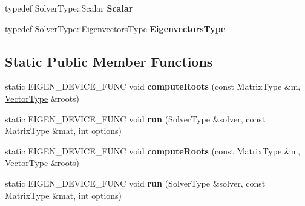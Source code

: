 \begin{DoxyCompactItemize}
typedef Solver\+Type\+::\+Scalar {\bfseries Scalar}
\item 
\mbox{\label{struct_eigen_1_1internal_1_1direct__selfadjoint__eigenvalues_3_01_solver_type_00_012_00_01false_01_4_ab88affec1ba41f7662e263fa86102255}} 
typedef Solver\+Type\+::\+Eigenvectors\+Type {\bfseries Eigenvectors\+Type}
\end{DoxyCompactItemize}
\subsection*{Static Public Member Functions}
\begin{DoxyCompactItemize}
\item 
\mbox{\label{struct_eigen_1_1internal_1_1direct__selfadjoint__eigenvalues_3_01_solver_type_00_012_00_01false_01_4_a49dab7c21eb393c3c3d45890bd34f58e}} 
static E\+I\+G\+E\+N\+\_\+\+D\+E\+V\+I\+C\+E\+\_\+\+F\+U\+NC void {\bfseries compute\+Roots} (const Matrix\+Type \&m, \hyperlink{struct_vector_type}{Vector\+Type} \&roots)
\item 
\mbox{\label{struct_eigen_1_1internal_1_1direct__selfadjoint__eigenvalues_3_01_solver_type_00_012_00_01false_01_4_addc88bfeaab72fc09c5429df3d680bd7}} 
static E\+I\+G\+E\+N\+\_\+\+D\+E\+V\+I\+C\+E\+\_\+\+F\+U\+NC void {\bfseries run} (Solver\+Type \&solver, const Matrix\+Type \&mat, int options)
\item 
\mbox{\label{struct_eigen_1_1internal_1_1direct__selfadjoint__eigenvalues_3_01_solver_type_00_012_00_01false_01_4_a49dab7c21eb393c3c3d45890bd34f58e}} 
static E\+I\+G\+E\+N\+\_\+\+D\+E\+V\+I\+C\+E\+\_\+\+F\+U\+NC void {\bfseries compute\+Roots} (const Matrix\+Type \&m, \hyperlink{struct_vector_type}{Vector\+Type} \&roots)
\item 
\mbox{\label{struct_eigen_1_1internal_1_1direct__selfadjoint__eigenvalues_3_01_solver_type_00_012_00_01false_01_4_addc88bfeaab72fc09c5429df3d680bd7}} 
static E\+I\+G\+E\+N\+\_\+\+D\+E\+V\+I\+C\+E\+\_\+\+F\+U\+NC void {\bfseries run} (Solver\+Type \&solver, const Matrix\+Type \&mat, int options)
\end{DoxyCompactItemize}


